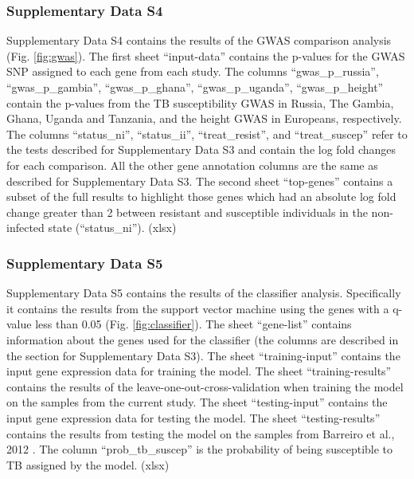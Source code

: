 \documentclass[fleqn,10pt]{wlscirep}
\begin{document}
\subsubsection*{Supplementary Data S4}

Supplementary Data S4 contains the results of the GWAS comparison
analysis (Fig. \ref{fig:gwas}). The first sheet “input-data” contains
the p-values for the GWAS SNP assigned to each gene from each study.
The columns “gwas\_p\_russia”, “gwas\_p\_gambia”, “gwas\_p\_ghana”,
“gwas\_p\_uganda”, “gwas\_p\_height” contain the p-values from the TB
susceptibility GWAS in Russia, The Gambia, Ghana, Uganda and Tanzania,
and the height GWAS in Europeans, respectively. The columns
“status\_ni”, “status\_ii”, “treat\_resist”, and “treat\_suscep” refer
to the tests described for Supplementary Data S3 and contain the log
fold changes for each comparison. All the other gene annotation
columns are the same as described for Supplementary Data S3. The
second sheet “top-genes” contains a subset of the full results to
highlight those genes which had an absolute log fold change greater
than 2 between resistant and susceptible individuals in the
non-infected state (“status\_ni”). (xlsx)
\subsubsection*{Supplementary Data S5}

Supplementary Data S5 contains the results of the classifier analysis.
Specifically it contains the results from the support vector machine
using the genes with a q-value less than 0.05 (Fig.
\ref{fig:classifier}). The sheet “gene-list” contains information
about the genes used for the classifier (the columns are described in
the section for Supplementary Data S3). The sheet “training-input”
contains the input gene expression data for training the model. The
sheet “training-results” contains the results of the
leave-one-out-cross-validation when training the model on the samples
from the current study. The sheet “testing-input” contains the input
gene expression data for testing the model. The sheet
“testing-results” contains the results from testing the model on the
samples from Barreiro et al., 2012 \cite{Barreiro2012}. The column
“prob\_tb\_suscep” is the probability of being susceptible to TB
assigned by the model. (xlsx)
\end{document}
